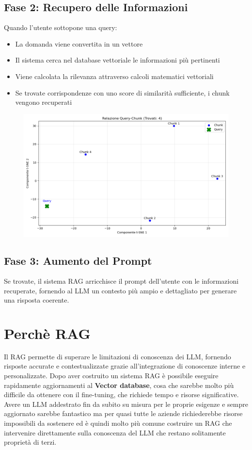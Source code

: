 \documentclass[12pt,a4paper,openright,twoside]{book}
\begin{document}
\subsection{Fase 2: Recupero delle Informazioni}
Quando l'utente sottopone una query:
\begin{itemize}
    \item La domanda viene convertita in un vettore
    \item Il sistema cerca nel database vettoriale le informazioni più pertinenti
    \item Viene calcolata la rilevanza attraverso calcoli matematici vettoriali
    \item Se trovate corrispondenze con uno score di similarità sufficiente, i chunk vengono recuperati
\end{itemize}

\begin{figure}[h]
    \raggedright
    \includegraphics[width=0.8\linewidth]{figures/plotSearch.png}
    \label{fig:Esempio distanze chunk e query}
\end{figure}
\subsection{Fase 3: Aumento del Prompt}
Se trovate, il sistema RAG arricchisce il prompt dell'utente con le informazioni recuperate, fornendo al LLM un contesto più ampio e dettagliato per generare una risposta coerente.

\section{Perchè RAG}
Il RAG permette di superare le limitazioni di conoscenza dei LLM, fornendo risposte accurate e contestualizzate 
grazie all'integrazione di conoscenze interne e personalizzate.
Dopo aver costruito un sistema RAG è possibile eseguire rapidamente aggiornamenti al \textbf{Vector database},
cosa che sarebbe molto più difficile da ottenere con il fine-tuning, che richiede tempo e risorse significative.
Avere un LLM addestrato fin da subito su misura per le proprie esigenze e sempre aggiornato sarebbe fantastico ma per quasi
tutte le aziende richiederebbe risorse impossibili da sostenere ed è quindi molto più comune costruire un RAG
che intervenire direttamente sulla conoscenza del LLM che restano solitamente proprietà di terzi.
\end{document}
